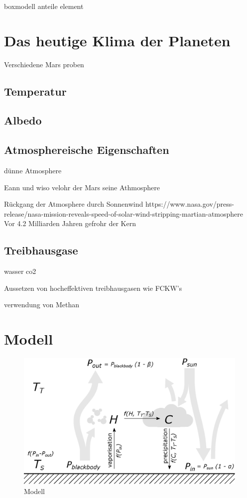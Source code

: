 \begin{refsection}
boxmodell anteile element



\section{Das heutige Klima der Planeten}

Verschiedene Mars proben

\subsection{Temperatur}

\subsection{Albedo}

\subsection{Atmosphereische Eigenschaften}

dünne Atmosphere

Eann und wiso velohr der Mars seine Athmosphere


Rückgang der Atmosphere durch Sonnenwind
	https://www.nasa.gov/press-release/nasa-mission-reveals-speed-of-solar-wind-stripping-martian-atmosphere
	Vor 4.2 Milliarden Jahren gefrohr der Kern


\subsection{Treibhausgase}

wasser co2



Aussetzen von hocheffektiven treibhausgasen wie FCKW's

verwendung von Methan 




\section{Modell}

\begin{figure}
	\centering
	\includegraphics[width=\textwidth]{Pictures/Model.eps}
	\caption{Modell}
\end{figure}



\end{refsection}
